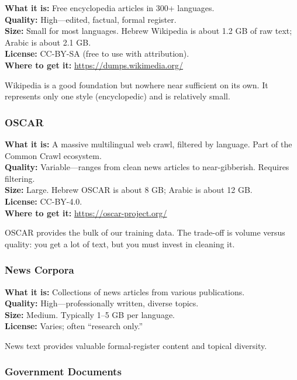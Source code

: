 \documentclass[11pt,a4paper]{article}
\begin{document}
\textbf{What it is:} Free encyclopedia articles in 300+ languages.\\
\textbf{Quality:} High---edited, factual, formal register.\\
\textbf{Size:} Small for most languages. Hebrew Wikipedia is about 1.2 GB of raw text; Arabic is about 2.1 GB.\\
\textbf{License:} CC-BY-SA (free to use with attribution).\\
\textbf{Where to get it:} \url{https://dumps.wikimedia.org/}

Wikipedia is a good foundation but nowhere near sufficient on its own. It represents only one style (encyclopedic) and is relatively small.

\subsubsection{OSCAR}

\textbf{What it is:} A massive multilingual web crawl, filtered by language. Part of the Common Crawl ecosystem.\\
\textbf{Quality:} Variable---ranges from clean news articles to near-gibberish. Requires filtering.\\
\textbf{Size:} Large. Hebrew OSCAR is about 8 GB; Arabic is about 12 GB.\\
\textbf{License:} CC-BY-4.0.\\
\textbf{Where to get it:} \url{https://oscar-project.org/}

OSCAR provides the bulk of our training data. The trade-off is volume versus quality: you get a lot of text, but you must invest in cleaning it.

\subsubsection{News Corpora}

\textbf{What it is:} Collections of news articles from various publications.\\
\textbf{Quality:} High---professionally written, diverse topics.\\
\textbf{Size:} Medium. Typically 1--5 GB per language.\\
\textbf{License:} Varies; often ``research only.''

News text provides valuable formal-register content and topical diversity.

\subsubsection{Government Documents}
\end{document}
